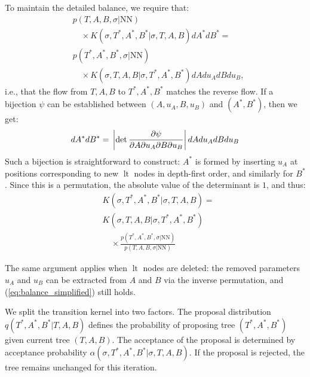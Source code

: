 \documentclass{ifacconf}
\DeclareMathOperator{\lt}{lt}
\begin{document}
	To maintain the detailed balance, we require that:
	\begin{equation}\label{eq:balance}
		\begin{aligned}
			&p(T, A, B, \sigma|\text{NN})\\
			&\quad \times K(\sigma, T^*, A^*, B^* | \sigma, T, A, B)dA^*dB^*=\\
			&p(T^*, A^*, B^*, \sigma|\text{NN})\\
			&\quad \times K(\sigma, T, A, B | \sigma, T^*, A^*, B^*)dAdu_AdBdu_B,
		\end{aligned}
	\end{equation}
	i.e., that the flow from $T, A, B$ to $T^*, A^*, B^*$  matches the reverse flow.
	If a bijection $\psi$ can be established between
	$(A, u_A, B, u_B)$ and $(A^*, B^*)$,
	then we get:
	\begin{equation}\label{eq:substitute}
		dA^*dB^*=\\
		\left | \det \frac{\partial \psi}{\partial A \partial u_A \partial B  \partial u_B } \right |
		dAdu_AdBdu_B
	\end{equation}
	Such a bijection is straightforward to construct: $A^*$ is formed by inserting $u_A$ at positions corresponding to new $\lt$ nodes in depth-first order, and similarly for $B^*$.
	Since this is a permutation, the absolute value of the determinant is $1$, and thus:
	\begin{equation}\label{eq:balance_simplified}
		\begin{aligned}
			&K(\sigma, T^*, A^*, B^* | \sigma, T, A, B) = \\
			&K(\sigma, T, A, B | \sigma, T^*, A^*, B^*)\\
			&\quad \times\frac{p(T^*, A^*, B^*, \sigma|\text{NN})}{p(T, A, B, \sigma|\text{NN})}
		\end{aligned}
	\end{equation}
	
	The same argument applies when $\lt$ nodes are deleted: the removed parameters $u_A$ and $u_B$ can be extracted from $A$ and $B$ via the inverse permutation, and (\ref{eq:balance_simplified}) still holds.
	
	We split the transition kernel into two factors.
	The proposal distribution $q(T^*, A^*, B^* | T, A, B)$ defines the probability of proposing tree $(T^*, A^*, B^*)$ given current tree $(T, A, B)$.
	The acceptance of the proposal is determined by acceptance probability $\alpha(\sigma, T^*, A^*, B^* |\sigma, T, A, B)$.
	If the proposal is rejected, the tree remains unchanged for this iteration.
	
\end{document}

